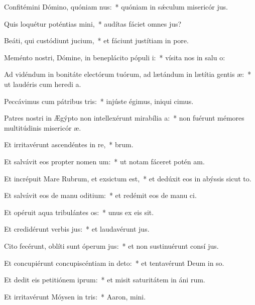 \item Confitémini Dómino, quóniam nus:~* quóniam in sǽculum misericór jus.
\item Quis loquétur poténtias mini,~* audítas fáciet omnes  jus?
\item Beáti, qui custódiunt jucium,~* et fáciunt justítiam in  pore.
\item Meménto nostri, Dómine, in beneplácito pópuli i:~* vísita nos in salu o:
\item Ad vidéndum in bonitáte electórum tuórum, ad lætándum in lætítia gentis æ:~* ut laudéris cum heredi a.
\item Peccávimus cum pátribus tris:~* injúste égimus, iniqui cimus.
\item Patres nostri in Ægýpto non intellexérunt mirabília a:~* non fuérunt mémores multitúdinis misericór æ.
\item Et irritavérunt ascendéntes in re,~*  brum.
\item Et salvávit eos propter nomen um:~* ut notam fáceret potén am.
\item Et incrépuit Mare Rubrum, et exsictum est,~* et dedúxit eos in abýssis sicut  to.
\item Et salvávit eos de manu oditium:~* et redémit eos de manu ci.
\item Et opéruit aqua tribulántes os:~* unus ex eis  sit.
\item Et credidérunt verbis jus:~* et laudavérunt  jus.
\item Cito fecérunt, oblíti sunt óperum jus:~* et non sustinuérunt consí jus.
\item Et concupiérunt concupiscéntiam in deto:~* et tentavérunt Deum in so.
\item Et dedit eis petitiónem iprum:~* et misit saturitátem in áni rum.
\item Et irritavérunt Móysen in tris:~* Aaron,  mini.

